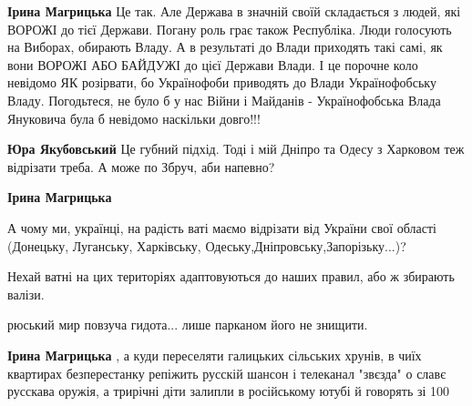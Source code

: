 \begin{itemize}
\begin{itemize}
\textbf{Ірина Магрицька} Це так. Але Держава в значній своїй складається з
людей, які ВОРОЖІ до тієї Держави. Погану роль грає також Республіка. Люди
голосують на Виборах, обирають Владу. А в результаті до Влади приходять такі
самі, як вони ВОРОЖІ АБО БАЙДУЖІ до цієї Держави Влади. І це порочне коло
невідомо ЯК розірвати, бо Українофоби приводять до Влади Українофобську Владу.
Погодьтеся, не було б у нас Війни і Майданів - Українофобська Влада Януковича
була б невідомо наскільки довго!!!

 
\textbf{Юра Якубовський} Це губний підхід. Тоді і мій Дніпро та Одесу з Харковом теж відрізати треба. А може по Збруч, аби напевно?

 
\textbf{Ірина Магрицька} 

А чому ми, українці, на радість ваті маємо відрізати від України свої області
(Донецьку, Луганську, Харківську, Одеську,Дніпровську,Запорізьку...)?

Нехай ватні на цих територіях адаптовуються до наших правил, або ж збирають
валізи.

рюський мир повзуча гидота... лише парканом його не знищити.

 
\textbf{Ірина Магрицька} , а куди переселяти галицьких сільських хрунів, в чиїх квартирах безперестанку репіжить русскій шансон і телеканал "звєзда" о славє русскава оружія, а трирічні діти залипли в російському ютубі й говорять зі 100%

 

\end{itemize}
\end{itemize}
